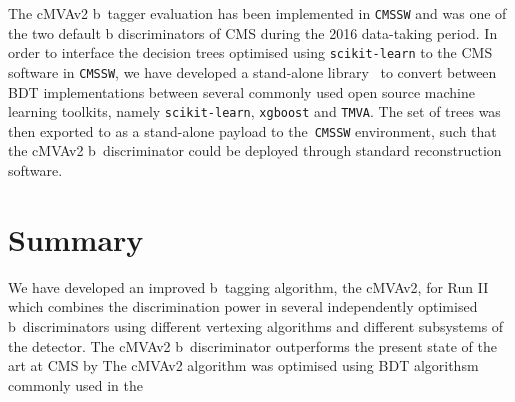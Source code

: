 The cMVAv2 b~tagger evaluation has been implemented in \texttt{CMSSW} and was one of the two default b discriminators of CMS during the 2016 data-taking period. In order to interface the decision trees optimised using \texttt{scikit-learn} to the CMS software in \texttt{CMSSW}, we have developed a stand-alone library~\cite{mlglue} to convert between BDT implementations between several commonly used open source machine learning toolkits, namely \texttt{scikit-learn}, \texttt{xgboost} and \texttt{TMVA}. The set of trees was then exported to as a stand-alone payload to the~\texttt{CMSSW} environment, such that the cMVAv2 b~discriminator could be deployed through standard reconstruction software.

\section{Summary}
We have developed an improved b~tagging algorithm, the cMVAv2, for Run II which combines the discrimination power in several independently optimised b~discriminators using different vertexing algorithms and different subsystems of the detector. The cMVAv2 b~discriminator outperforms the present state of the art at CMS by  
The cMVAv2 algorithm was optimised using BDT algorithsm commonly used in the  